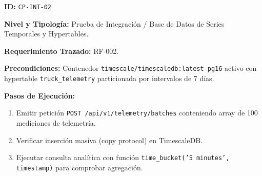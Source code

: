 \par\noindent\textbf{ID:} \texttt{C\allowbreak{}P\allowbreak{}-\allowbreak{}I\allowbreak{}N\allowbreak{}T\allowbreak{}-\allowbreak{}0\allowbreak{}2\allowbreak{}}\par
\par\noindent\textbf{Nivel y Tipología:} Prueba de Integración / Base de Datos de Series Temporales y Hypertables.\par
\par\noindent\textbf{Requerimiento Trazado:} RF-002.\par
\par\noindent\textbf{Precondiciones:} Contenedor \texttt{t\allowbreak{}i\allowbreak{}m\allowbreak{}e\allowbreak{}s\allowbreak{}c\allowbreak{}a\allowbreak{}l\allowbreak{}e\allowbreak{}/\allowbreak{}t\allowbreak{}i\allowbreak{}m\allowbreak{}e\allowbreak{}s\allowbreak{}c\allowbreak{}a\allowbreak{}l\allowbreak{}e\allowbreak{}d\allowbreak{}b\allowbreak{}:\allowbreak{}l\allowbreak{}a\allowbreak{}t\allowbreak{}e\allowbreak{}s\allowbreak{}t\allowbreak{}-\allowbreak{}p\allowbreak{}g\allowbreak{}1\allowbreak{}6\allowbreak{}} activo con hypertable \texttt{t\allowbreak{}r\allowbreak{}u\allowbreak{}c\allowbreak{}k\allowbreak{}\_\allowbreak{}t\allowbreak{}e\allowbreak{}l\allowbreak{}e\allowbreak{}m\allowbreak{}e\allowbreak{}t\allowbreak{}r\allowbreak{}y\allowbreak{}} particionada por intervalos de 7 días.\par
\par\noindent\textbf{Pasos de Ejecución:} \par
\begin{enumerate}
\item Emitir petición \texttt{P\allowbreak{}O\allowbreak{}S\allowbreak{}T\allowbreak{} /\allowbreak{}a\allowbreak{}p\allowbreak{}i\allowbreak{}/\allowbreak{}v\allowbreak{}1\allowbreak{}/\allowbreak{}t\allowbreak{}e\allowbreak{}l\allowbreak{}e\allowbreak{}m\allowbreak{}e\allowbreak{}t\allowbreak{}r\allowbreak{}y\allowbreak{}/\allowbreak{}b\allowbreak{}a\allowbreak{}t\allowbreak{}c\allowbreak{}h\allowbreak{}e\allowbreak{}s\allowbreak{}} conteniendo array de 100 mediciones de telemetría.
\item Verificar inserción masiva (copy protocol) en TimescaleDB.
\item Ejecutar consulta analítica con función \texttt{t\allowbreak{}i\allowbreak{}m\allowbreak{}e\allowbreak{}\_\allowbreak{}b\allowbreak{}u\allowbreak{}c\allowbreak{}k\allowbreak{}e\allowbreak{}t\allowbreak{}(\allowbreak{}'\allowbreak{}5\allowbreak{} m\allowbreak{}i\allowbreak{}n\allowbreak{}u\allowbreak{}t\allowbreak{}e\allowbreak{}s\allowbreak{}'\allowbreak{},\allowbreak{} t\allowbreak{}i\allowbreak{}m\allowbreak{}e\allowbreak{}s\allowbreak{}t\allowbreak{}a\allowbreak{}m\allowbreak{}p\allowbreak{})\allowbreak{}} para comprobar agregación.
\end{enumerate}
